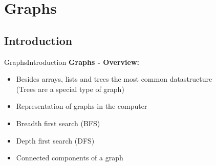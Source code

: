 \section{Graphs}
\subsection{Introduction}

\begin{frame}{Graphs}{Introduction}
  \textbf{Graphs - Overview:}
  \begin{itemize}
    \item<2->
      Besides arrays, lists and trees the most common datastructure\\
      (Trees are a special type of graph)
    \item<3->
      Representation of graphs in the computer
    \item<4->
      Breadth first search (BFS)
    \item<5->
      Depth first search (DFS)
    \item<6->
      Connected components of a graph
  \end{itemize}
\end{frame}        

